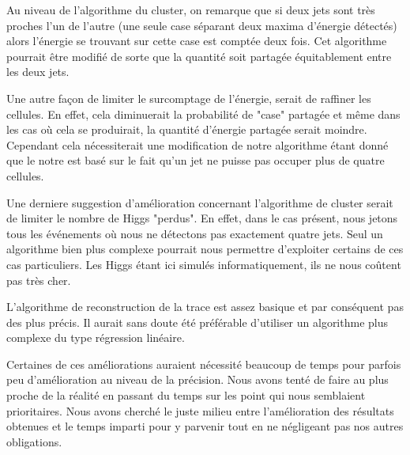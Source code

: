 \documentclass[11pt]{article}
\begin{document}
Au niveau de l'algorithme du cluster, on remarque que si deux jets sont très proches l'un de l'autre (une seule case 
s\'eparant deux maxima d'énergie détectés) alors l'énergie se trouvant sur cette
case est comptée deux fois. Cet algorithme
 pourrait être modifié de sorte que la quantité soit partagée équitablement
entre les deux jets.

Une autre façon de limiter le surcomptage de l'énergie, serait de raffiner les 
cellules. En effet, cela diminuerait la probabilité de "case" partagée et même dans les cas où cela se produirait, la
quantité d'énergie partagée serait moindre. Cependant cela nécessiterait une modification de notre 
algorithme 
étant donné que le notre est basé sur le fait qu'un jet ne puisse pas occuper
plus de quatre cellules.

Une derniere suggestion d'amélioration concernant l'algorithme de cluster serait de limiter le nombre
de Higgs "perdus". En effet, dans le cas présent, nous jetons tous les
événements où nous ne détectons pas exactement quatre jets. Seul un algorithme
bien plus complexe pourrait nous permettre d'exploiter certains de ces cas
particuliers. Les Higgs étant ici simulés informatiquement, ils ne nous coûtent
pas très cher.

L'algorithme de reconstruction de la trace est assez basique et par conséquent
pas des plus précis. Il aurait sans doute
été préférable d'utiliser un algorithme plus complexe du type régression linéaire.


Certaines de ces améliorations auraient nécessité beaucoup de temps 
pour parfois peu d'amélioration au niveau de la précision. Nous avons tenté de
faire au plus proche de la réalité en passant du temps sur les point qui nous
semblaient prioritaires. Nous avons cherché le juste milieu entre l'amélioration
des résultats obtenues et le temps imparti pour y parvenir tout en ne négligeant
pas nos autres obligations.


		
\end{document}

